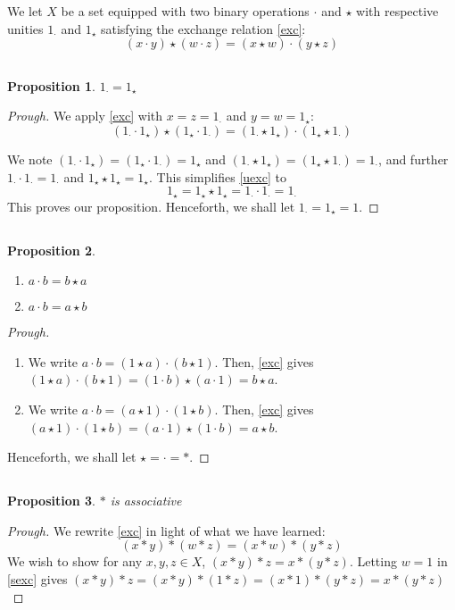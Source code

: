 \documentclass[english]{article}
\newcommand{\prob}[1]{\setcounter{section}{#1-1}\section{}}
\newcommand{\prt}[1]{\setcounter{subsection}{#1-1}\subsection{}}
\newtheorem*{proposition*}{Proposition}
\theoremstyle{remark}
\theoremstyle{definition}
\newcommand{\ondt}{1_{\cdot}}
\newcommand{\onst}{1_{\star}}
\begin{document}
\prob{2}
We let $X$ be a set equipped with two binary operations $\cdot$ and $\star$ with respective unities $1_{\cdot}$ and $1_{\star}$ satisfying the exchange relation \eqref{exc}:\begin{equation}\label{exc} 
	(x\cdot y)\star (w\cdot z)=(x\star w)\cdot (y\star z)
\end{equation}

\prt{1}\begin{proposition*}
	$\ondt=\onst$
\end{proposition*}
\begin{proof}[Prough]
	We apply \eqref{exc} with $x=z=\ondt$ and $y=w=\onst$:
\begin{equation}\label{uexc}(\ondt\cdot \onst)\star (\onst\cdot \ondt)=(\ondt\star \onst)\cdot (\onst\star \ondt)\end{equation}

We note $(\ondt\cdot\onst)=(\onst\cdot\ondt)=\onst$ and $(\ondt\star\onst)=(\onst\star\ondt)=\ondt$, and further $\ondt\cdot\ondt=\ondt$ and $\onst\star\onst=\onst$. This simplifies \eqref{uexc} to \begin{equation*}
	\onst=\onst\star\onst=\ondt\cdot\ondt=\ondt
\end{equation*}
This proves our proposition. Henceforth, we shall let $\ondt=\onst=1$.
\end{proof}
\prt{2}\begin{proposition*}
	\begin{enumerate}[label=\emph{(\roman*)}]
		\item $a\cdot b=b\star a$
		\item $a\cdot b=a\star b$
	\end{enumerate}
\end{proposition*}
\begin{proof}[Prough]
	\begin{enumerate}[label=\emph{(\roman*)}]
		\item  We write $a\cdot b=(1\star a)\cdot (b\star 1)$. Then, \eqref{exc} gives $(1\star a)\cdot (b\star 1)=(1\cdot b)\star(a\cdot 1)=b\star a$.
		\item We write $a\cdot b=(a\star 1)\cdot (1\star b)$. Then, \eqref{exc} gives $(a\star 1)\cdot (1\star b)=(a\cdot 1)\star(1\cdot b)=a\star b$.
	\end{enumerate}
Henceforth, we shall let $\star=\cdot=*$.
\end{proof}\prt{3}
\begin{proposition*}
	$*$ is associative
\end{proposition*}
\begin{proof}[Prough]
	We rewrite \eqref{exc} in light of what we have learned: \begin{equation}
		\label{sexc}(x*y)*(w*z)=(x*w)*(y*z)
	\end{equation}
	We wish to show for any $x,y,z\in X$, $(x*y)*z=x*(y*z)$. Letting $w=1$ in \eqref{sexc} gives $(x*y)*z=(x*y)*(1*z)=(x*1)*(y*z)=x*(y*z)$
\end{proof}
\end{document}
